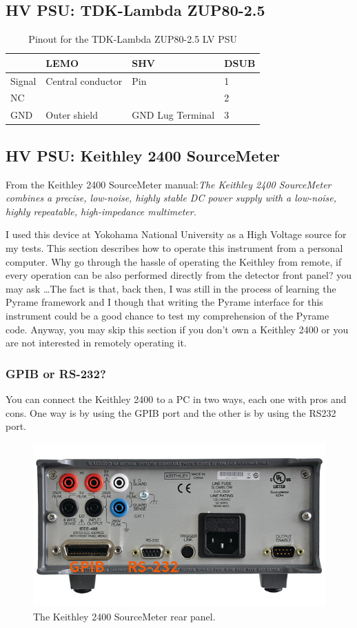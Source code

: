 \subsection{HV PSU: TDK-Lambda ZUP80-2.5}
\begin{table}[H]
  \centering
  \begin{tabular}{|l|l l l|}
    \hline
    & \textbf{LEMO} & \textbf{SHV} & \textbf{DSUB} \\
    \hline
    Signal & Central conductor & Pin & 1 \\
    NC &  &  & 2 \\
    GND & Outer shield & GND Lug Terminal & 3 \\
    \hline
  \end{tabular}
  \caption{Pinout for the TDK-Lambda ZUP80-2.5 LV PSU}
\end{table}

\subsection{HV PSU: Keithley 2400 SourceMeter}
From the Keithley 2400 SourceMeter manual:\textit{The Keithley 2400 SourceMeter
  combines a precise, low-noise, highly stable DC power supply with a low-noise,
  highly repeatable, high-impedance multimeter.}

I used this device at Yokohama National University as a High Voltage source for
my tests. This section describes how to operate this instrument from a personal
computer. Why go through the hassle of operating the Keithley from remote, if
every operation can be also performed directly from the detector front panel?
you may ask \dots The fact is that, back then, I was still in the process of
learning the Pyrame framework and I though that writing the Pyrame interface for
this instrument could be a good chance to test my comprehension of the Pyrame
code. Anyway, you may skip this section if you don't own a Keithley 2400 or you
are not interested in remotely operating it.

\subsubsection{GPIB or RS-232?}
You can connect the Keithley 2400 to a PC in two ways, each one with pros and
cons. One way is by using the GPIB port and the other is by using the RS232
port.
\begin{figure}[H]
  \centering \includegraphics[width=0.7\linewidth]{keithley-2400-rear-panel}
  \caption{The Keithley 2400 SourceMeter rear panel.}\label{keithley-2400-rear-panel}
\end{figure}

